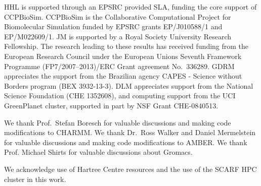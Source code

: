 \documentclass[journal=jctcce,manuscript=article]{achemso}
\begin{document}


\listoftodos


\begin{acknowledgement}
  HHL is supported through an EPSRC provided SLA, funding the core
  support of CCPBioSim.  CCPBioSim is the Collaborative Computational
  Project for Biomolecular Simulation funded by EPSRC grants
  EP/J010588/1 and EP/M022609/1.  JM is supported by a Royal Society
  University Research Fellowship.  The research leading to these
  results has received funding from the European Research Council
  under the European Unions Seventh Framework Programme
  (FP7/2007--2013)/ERC Grant agreement No.\ 336289.  GDRM appreciates
  the support from the Brazilian agency CAPES - Science without
  Borders program (BEX 3932-13-3).  DLM appreciates support from the
  National Science Foundation (CHE 1352608), and computing support
  from the UCI GreenPlanet cluster, supported in part by NSF Grant
  CHE-0840513.

  We thank Prof.\ Stefan Boresch for valuable discussions and making code
  modifications to CHARMM.  We thank Dr.\ Ross Walker and Daniel Mermelstein
  for valuable discussions and making code modifications to AMBER.  We thank
  Prof. Michael Shirts for valuable discussions about Gromacs.

  We acknowledge use of Hartree Centre resources and the use of the
  SCARF HPC cluster in this work.
\end{acknowledgement}



\end{document}
